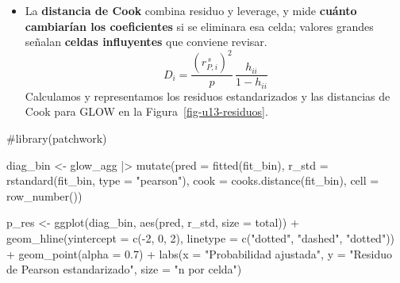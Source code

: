 \documentclass[
  letterpaper,
  DIV=11,
  numbers=noendperiod]{scrartcl}
\newenvironment{Shaded}{\begin{snugshade}}{\end{snugshade}}
\newcommand{\AttributeTok}[1]{\textcolor[rgb]{0.40,0.45,0.13}{#1}}
\newcommand{\CommentTok}[1]{\textcolor[rgb]{0.37,0.37,0.37}{#1}}
\newcommand{\DecValTok}[1]{\textcolor[rgb]{0.68,0.00,0.00}{#1}}
\newcommand{\FloatTok}[1]{\textcolor[rgb]{0.68,0.00,0.00}{#1}}
\newcommand{\FunctionTok}[1]{\textcolor[rgb]{0.28,0.35,0.67}{#1}}
\newcommand{\NormalTok}[1]{\textcolor[rgb]{0.00,0.23,0.31}{#1}}
\newcommand{\OtherTok}[1]{\textcolor[rgb]{0.00,0.23,0.31}{#1}}
\newcommand{\SpecialCharTok}[1]{\textcolor[rgb]{0.37,0.37,0.37}{#1}}
\newcommand{\StringTok}[1]{\textcolor[rgb]{0.13,0.47,0.30}{#1}}
\providecommand{\tightlist}{%
  \setlength{\itemsep}{0pt}\setlength{\parskip}{0pt}}\usepackage{longtable,booktabs,array}
\begin{document}
\begin{itemize}
\tightlist
\item
  La \textbf{distancia de Cook} combina residuo y leverage, y mide
  \textbf{cuánto cambiarían los coeficientes} si se eliminara esa celda;
  valores grandes señalan \textbf{celdas influyentes} que conviene
  revisar. \[
  D_i=\frac{(r^{\,s}_{P,i})^2}{p}\,\frac{h_{ii}}{1-h_{ii}}
  \] Calculamos y representamos los residuos estandarizados y las
  distancias de Cook para GLOW en la Figura~\ref{fig-u13-residuos}.
\end{itemize}

\begin{Shaded}
\begin{Highlighting}[]
\CommentTok{\#library(patchwork)}

\NormalTok{diag\_bin }\OtherTok{\textless{}{-}}\NormalTok{ glow\_agg }\SpecialCharTok{|\textgreater{}}
  \FunctionTok{mutate}\NormalTok{(}\AttributeTok{pred  =} \FunctionTok{fitted}\NormalTok{(fit\_bin),}
         \AttributeTok{r\_std =} \FunctionTok{rstandard}\NormalTok{(fit\_bin, }\AttributeTok{type =} \StringTok{"pearson"}\NormalTok{),}
         \AttributeTok{cook  =} \FunctionTok{cooks.distance}\NormalTok{(fit\_bin),}
         \AttributeTok{cell  =} \FunctionTok{row\_number}\NormalTok{())}

\NormalTok{p\_res }\OtherTok{\textless{}{-}} \FunctionTok{ggplot}\NormalTok{(diag\_bin, }\FunctionTok{aes}\NormalTok{(pred, r\_std, }\AttributeTok{size =}\NormalTok{ total)) }\SpecialCharTok{+}
  \FunctionTok{geom\_hline}\NormalTok{(}\AttributeTok{yintercept =} \FunctionTok{c}\NormalTok{(}\SpecialCharTok{{-}}\DecValTok{2}\NormalTok{, }\DecValTok{0}\NormalTok{, }\DecValTok{2}\NormalTok{), }\AttributeTok{linetype =} \FunctionTok{c}\NormalTok{(}\StringTok{"dotted"}\NormalTok{, }\StringTok{"dashed"}\NormalTok{, }\StringTok{"dotted"}\NormalTok{)) }\SpecialCharTok{+}
  \FunctionTok{geom\_point}\NormalTok{(}\AttributeTok{alpha =} \FloatTok{0.7}\NormalTok{) }\SpecialCharTok{+}
  \FunctionTok{labs}\NormalTok{(}\AttributeTok{x =} \StringTok{"Probabilidad ajustada"}\NormalTok{, }\AttributeTok{y =} \StringTok{"Residuo de Pearson estandarizado"}\NormalTok{,}
       \AttributeTok{size =} \StringTok{"n por celda"}\NormalTok{)}


\end{Highlighting}
\end{Shaded}
\end{document}

